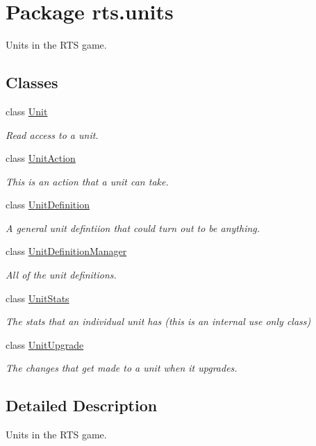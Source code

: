 \hypertarget{namespacerts_1_1units}{
\section{Package rts.units}
\label{namespacerts_1_1units}
}


Units in the RTS game.  


\subsection*{Classes}
\begin{DoxyCompactItemize}
\item 
class \hyperlink{classrts_1_1units_1_1_unit}{Unit}
\begin{DoxyCompactList}\small\item\em Read access to a unit. \end{DoxyCompactList}\item 
class \hyperlink{classrts_1_1units_1_1_unit_action}{UnitAction}
\begin{DoxyCompactList}\small\item\em This is an action that a unit can take. \end{DoxyCompactList}\item 
class \hyperlink{classrts_1_1units_1_1_unit_definition}{UnitDefinition}
\begin{DoxyCompactList}\small\item\em A general unit defintiion that could turn out to be anything. \end{DoxyCompactList}\item 
class \hyperlink{classrts_1_1units_1_1_unit_definition_manager}{UnitDefinitionManager}
\begin{DoxyCompactList}\small\item\em All of the unit definitions. \end{DoxyCompactList}\item 
class \hyperlink{classrts_1_1units_1_1_unit_stats}{UnitStats}
\begin{DoxyCompactList}\small\item\em The stats that an individual unit has (this is an internal use only class) \end{DoxyCompactList}\item 
class \hyperlink{classrts_1_1units_1_1_unit_upgrade}{UnitUpgrade}
\begin{DoxyCompactList}\small\item\em The changes that get made to a unit when it upgrades. \end{DoxyCompactList}\end{DoxyCompactItemize}


\subsection{Detailed Description}
Units in the RTS game. 